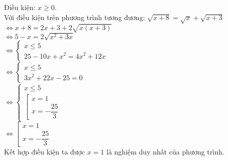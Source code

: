 \begin{Answer}{5}
Điều kiện: $ x \geq 0 $. \\
Với điều kiện trên phương trình tương đương: $ \sqrt{x+8 } = \sqrt{x } + \sqrt{x + 3}  $ \\
$ \Leftrightarrow x+8 = 2x +3 + 2 \sqrt{x(x+3 ) } $ \\
$ \Leftrightarrow 5-x = 2 \sqrt{x^2 + 3x } $ \\
$ \Leftrightarrow \begin{cases}
    x \leq 5 \\
    25 -10x + x^2 = 4x^2 + 12x
\end{cases} $ \\
$ \Leftrightarrow \begin{cases}
    x \leq 5 \\
    3x^2 +22x -25 =0
\end{cases} $ \\
$ \Leftrightarrow \begin{cases}
    x \leq 5 \\
    \left[
        \begin{array}{l}
            x =1 \\
            x= -\dfrac{25 }{3 }
        \end{array}
    \right.
\end{cases} $ \\
$ \Leftrightarrow \left[
    \begin{array}{l}
        x =1 \\
        x=-\dfrac{25 }{3 }
    \end{array}
\right. $ \\
Kết hợp điều kiện ta được $x=1$ là nghiệm duy nhất của phương trình.
\end{Answer}
